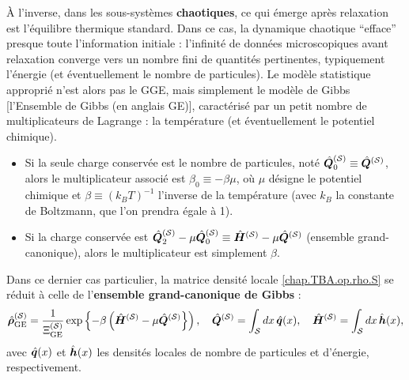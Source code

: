 \smallskip


À l’inverse, dans les sous-systèmes {\bf chaotiques}, ce qui émerge après relaxation est l’équilibre thermique standard. Dans ce cas, la dynamique chaotique “efface” presque toute l’information initiale : l’infinité de données microscopiques avant relaxation converge vers un nombre fini de quantités pertinentes, typiquement l’énergie (et éventuellement le nombre de particules). Le modèle statistique approprié n’est alors pas le \gls{GGE}, mais simplement le modèle de Gibbs [l'Ensemble de Gibbs (en anglais \gls{GE})], caractérisé par un petit nombre de multiplicateurs de Lagrange : la température (et éventuellement le potentiel chimique).

\begin{itemize}[label=$\bullet$]
	\item Si la seule charge conservée est le nombre de particules, noté $\hat{\bm{Q}}_0^{(\mathcal{S})} \equiv \hat{\bm{Q}}^{(\mathcal{S})}$, alors le multiplicateur associé est $\beta_0 \equiv -\beta \mu$, où $\mu$ désigne le potentiel chimique et $\beta \equiv (k_B T)^{-1}$ l’inverse de la température (avec $k_B$ la constante de Boltzmann, que l’on prendra égale à 1).
	
	\item Si la charge conservée est $\hat{\bm{Q}}_2^{(\mathcal{S})}-\mu\hat{\bm{Q}}_0^{(\mathcal{S})}  \equiv \hat{\bm{H}}^{(\mathcal{S})} - \mu \hat{\bm{Q}}^{(\mathcal{S})} $ (ensemble grand-canonique), alors le multiplicateur est simplement $ \beta$.
\end{itemize}

Dans ce dernier cas particulier, la matrice densité locale \eqref{chap.TBA.op.rho.S} se réduit à celle de l’{\bf ensemble grand-canonique de Gibbs} :
\begin{eqnarray}
	\hat{\bm{\rho}}^{(\mathcal{S})}_{\mathrm{GE}} = \frac{1}{\Xi^{(\mathcal{S})}_{\mathrm{GE}} }\exp \left \{ - \beta \left (\hat{\bm{H}}^{(\mathcal{S})} - \mu \hat{\bm{Q}}^{(\mathcal{S})} \right \} \right), \quad \hat{\bm{Q}}^{(\mathcal{S})} = \int_\mathcal{S} dx \, \hat{\bm{q}}(x), \quad \hat{\bm{H}}^{(\mathcal{S})} = \int_\mathcal{S} dx \, \hat{\bm{h}}(x),  \label{chap.TBA.op.rho.S.GE}	
\end{eqnarray}
avec $\hat{\bm{q}}(x)$ et $\hat{\bm{h}}(x)$ les densités locales de nombre de particules et d’énergie, respectivement.

